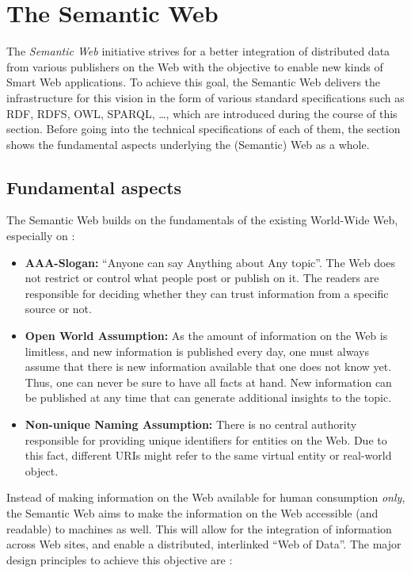 
\section{The Semantic Web}
\label{sec:semantic_web}

The \emph{Semantic Web} initiative strives for a better integration of distributed data from various publishers on the Web with the objective to enable new kinds of Smart Web applications. To achieve this goal, the Semantic Web delivers the infrastructure for this vision in the form of various standard specifications such as \gls{RDF}, \gls{RDFS}, \gls{OWL}, \gls{SPARQL}, \ldots, which are introduced during the course of this section. Before going into the technical specifications of each of them, the section shows the fundamental aspects underlying the (Semantic) Web as a whole.

\subsection{Fundamental aspects}
\label{subsec:fundamentals_semweb}

The Semantic Web builds on the fundamentals of the existing World-Wide Web, especially on \citep[pg. 4-11]{allemang2011semantic}: \@

\begin{itemize}
	\item \textbf{AAA-Slogan:} ``Anyone can say Anything about Any topic''. The Web does not restrict or control what people post or publish on it. The readers are responsible for deciding whether they can trust information from a specific source or not.
	\item \textbf{Open World Assumption:} As the amount of information on the Web is limitless, and new information is published every day, one must always assume that there is new information available that one does not know yet. Thus, one can never be sure to have all facts at hand. New information can be published at any time that can generate additional insights to the topic.
	\item \textbf{Non-unique Naming Assumption:} There is no central authority responsible for providing unique identifiers for entities on the Web. Due to this fact, different \gls{URI}s might refer to the same virtual entity or real-world object.
\end{itemize}

Instead of making information on the Web available for human consumption \emph{only}, the Semantic Web aims to make the information on the Web accessible (and readable) to machines as well. This will allow for the integration of information across Web sites, and enable a distributed, interlinked ``Web of Data''. The major design principles to achieve this objective are \citep[pg. 1-22]{antoniou2012semantic}: \@

